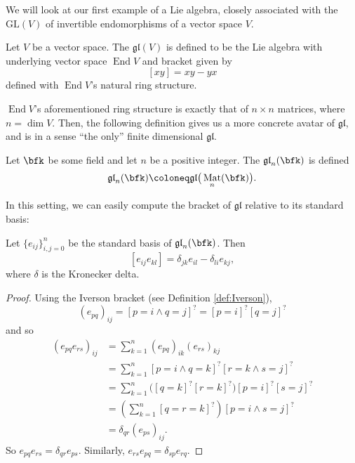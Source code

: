 \documentclass{article}
\newcommand{\lb}[1]{\ensuremath{\left[{#1}\right]}}
\newcommand{\iverson}[1]{\ensuremath{\left[{#1}\right]^?}}
\DeclareMathOperator{\End}{End}
\DeclareMathOperator{\Mat}{Mat}
\newcommand*\GL{\ensuremath{\text{GL}}}
\newcommand*\glalg{\ensuremath{\mathfrak{gl}}}
\begin{document}
We will look at our first example of a Lie algebra, closely associated with the  $\GL(V)$ of invertible endomorphisms of a vector space $V$.

\begin{definition}[$\glalg$, abstractly]
    Let $V$ be a vector space.
    The  $\glalg(V)$ is defined to be the Lie algebra with underlying vector space $\End V$ and bracket given by
    \[
        \lb{xy}
        =
        xy - yx
    \]
    defined with $\End V$'s natural ring structure.
\end{definition}

    $\End V$'s aforementioned ring structure is exactly that of $n \times n$ matrices, where $n = \dim V$.
    Then, the following definition gives us a more concrete avatar of $\glalg$, and is in a sense ``the only'' finite dimensional $\glalg$.

\begin{definition}[$\glalg$, concretely]
    Let $\bfk$ be some field and let $n$ be a positive integer.
    The  $\glalg_n(\bfk)$ is defined
    \[
        \glalg_n(\bfk)
        \coloneq
        \glalg\big(\Mat_n(\bfk)\big).
    \]
\end{definition}

In this setting, we can easily compute the bracket of $\glalg$ relative to its standard basis:

\begin{proposition}
    Let $\{e_{ij}\}_{i,j=0}^n$ be the standard basis of $\glalg_n(\bfk)$.
    Then
    \[
        \lb{e_{ij}e_{kl}}
        =
        \delta_{jk}e_{il}
        -
        \delta_{li}e_{kj},
    \]
    where $\delta$ is the Kronecker delta.
\end{proposition}

\begin{proof}
    Using the Iverson bracket (see Definition \ref{def:Iverson}),
    \[
        (e_{pq})_{ij}
        =
        \iverson{p=i \wedge q=j}
        =
        \iverson{p=i}\iverson{q=j}
    \]
    and so
    \begin{align*}
        (e_{pq}e_{rs})_{ij}
        &=
        \sum_{k=1}^n
        (e_{pq})_{ik}
        (e_{rs})_{kj}
        \\
        &=
        \sum_{k=1}^n
        \iverson{p=i \wedge q=k}
        \iverson{r=k \wedge s=j}
        \\
        &=
        \sum_{k=1}^n
        \Big(
            \iverson{q=k}\iverson{r=k}
        \Big)
        \iverson{p=i}
        \iverson{s=j}
        \\
        &=
        \left(
            \sum_{k=1}^n
            \iverson{q=r=k}
        \right)
        \iverson{p=i \wedge s=j}
        \\
        &=
        \delta_{qr}
        (e_{ps})_{ij}.
    \end{align*}
    So $e_{pq}e_{rs} = \delta_{qr}e_{ps}$. 
    Similarly,
    $e_{rs}e_{pq} = \delta_{sp}e_{rq}$.
\end{proof}
\end{document}
